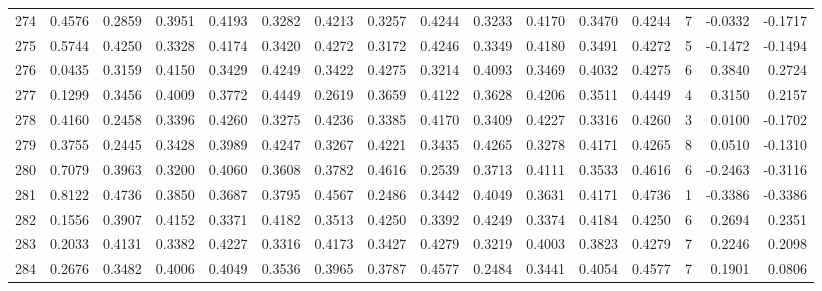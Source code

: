 \begin{tabular}{lrrrrrrrrrrrrrrr}
274 &      0.4576 &  0.2859 &  0.3951 &  0.4193 &  0.3282 &  0.4213 &  0.3257 &  0.4244 &  0.3233 &  0.4170 &   0.3470 &     0.4244 &      7 &                   -0.0332 &                    -0.1717 \\
275 &      0.5744 &  0.4250 &  0.3328 &  0.4174 &  0.3420 &  0.4272 &  0.3172 &  0.4246 &  0.3349 &  0.4180 &   0.3491 &     0.4272 &      5 &                   -0.1472 &                    -0.1494 \\
276 &      0.0435 &  0.3159 &  0.4150 &  0.3429 &  0.4249 &  0.3422 &  0.4275 &  0.3214 &  0.4093 &  0.3469 &   0.4032 &     0.4275 &      6 &                    0.3840 &                     0.2724 \\
277 &      0.1299 &  0.3456 &  0.4009 &  0.3772 &  0.4449 &  0.2619 &  0.3659 &  0.4122 &  0.3628 &  0.4206 &   0.3511 &     0.4449 &      4 &                    0.3150 &                     0.2157 \\
278 &      0.4160 &  0.2458 &  0.3396 &  0.4260 &  0.3275 &  0.4236 &  0.3385 &  0.4170 &  0.3409 &  0.4227 &   0.3316 &     0.4260 &      3 &                    0.0100 &                    -0.1702 \\
279 &      0.3755 &  0.2445 &  0.3428 &  0.3989 &  0.4247 &  0.3267 &  0.4221 &  0.3435 &  0.4265 &  0.3278 &   0.4171 &     0.4265 &      8 &                    0.0510 &                    -0.1310 \\
280 &      0.7079 &  0.3963 &  0.3200 &  0.4060 &  0.3608 &  0.3782 &  0.4616 &  0.2539 &  0.3713 &  0.4111 &   0.3533 &     0.4616 &      6 &                   -0.2463 &                    -0.3116 \\
281 &      0.8122 &  0.4736 &  0.3850 &  0.3687 &  0.3795 &  0.4567 &  0.2486 &  0.3442 &  0.4049 &  0.3631 &   0.4171 &     0.4736 &      1 &                   -0.3386 &                    -0.3386 \\
282 &      0.1556 &  0.3907 &  0.4152 &  0.3371 &  0.4182 &  0.3513 &  0.4250 &  0.3392 &  0.4249 &  0.3374 &   0.4184 &     0.4250 &      6 &                    0.2694 &                     0.2351 \\
283 &      0.2033 &  0.4131 &  0.3382 &  0.4227 &  0.3316 &  0.4173 &  0.3427 &  0.4279 &  0.3219 &  0.4003 &   0.3823 &     0.4279 &      7 &                    0.2246 &                     0.2098 \\
284 &      0.2676 &  0.3482 &  0.4006 &  0.4049 &  0.3536 &  0.3965 &  0.3787 &  0.4577 &  0.2484 &  0.3441 &   0.4054 &     0.4577 &      7 &                    0.1901 &                     0.0806 \\

\end{tabular}
